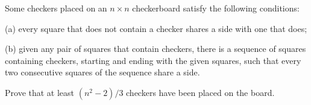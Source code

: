 Some checkers placed on an $n \times n$ checkerboard satisfy the following conditions:

(a) every square that does not contain a checker shares a side with one that does;

(b) given any pair of squares that contain checkers, there is a sequence of squares containing checkers, starting and ending with the given squares, such that every two consecutive squares of the sequence share a side.

Prove that at least $(n^{2}-2)/3$ checkers have been placed on the board.